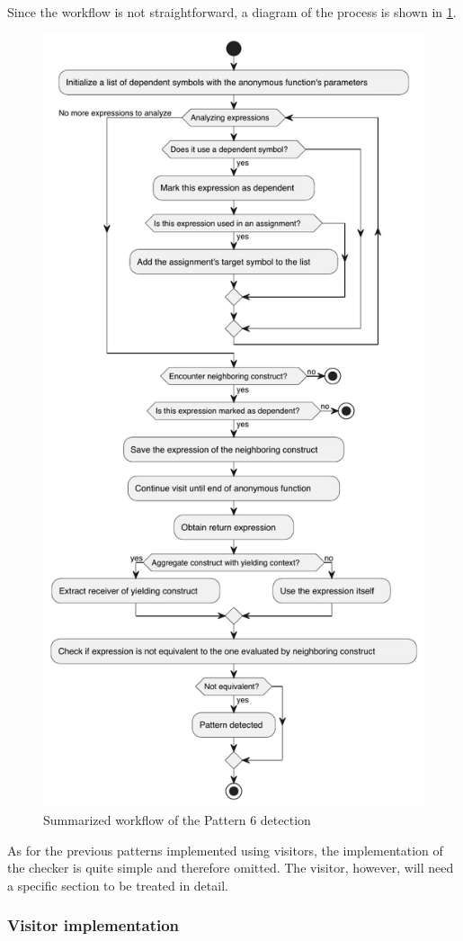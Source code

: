 \documentclass[12pt,a4paper,openright,twoside]{book}
\begin{document}
Since the workflow is not straightforward, a diagram of the process is shown in
\cref{fig:p6-workflow}.
%
\begin{figure}
  \centering
  \includegraphics[width=.6\linewidth]{figures/p6-workflow.pdf}
  \caption{Summarized workflow of the Pattern 6 detection}
  \label{fig:p6-workflow}
\end{figure}
%
As for the previous patterns implemented using visitors, the implementation of
the checker is quite simple and therefore omitted. The visitor, however, will
need a specific section to be treated in detail. 

\subsubsection{Visitor implementation}
\end{document}
